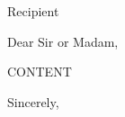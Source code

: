\documentclass[11pt]{letter}
\date{{{DATE}}}
\begin{document}
\begin{letter}{Recipient}
\opening{Dear Sir or Madam,}

{{CONTENT}}

\closing{Sincerely,}
\end{letter}
\end{document}
